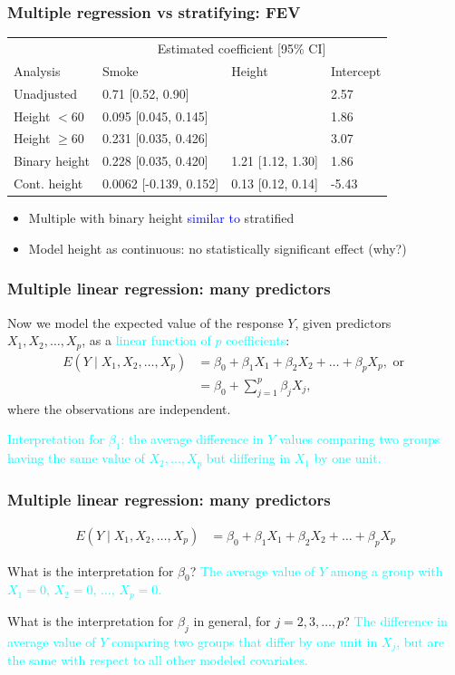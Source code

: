 \documentclass[12pt, 
hyperref={colorlinks=true, linkcolor=blue, urlcolor=cyan}]{beamer}
\begin{document}
\begin{frame}
\frametitle{Multiple regression vs stratifying: FEV}
\vspace{-1cm}\hspace*{-0.75cm}\begin{tabular}{llll}
& \multicolumn{3}{c}{Estimated coefficient [95\% CI]} \\
Analysis & Smoke & Height & Intercept \\
\hline
Unadjusted  & 0.71 [0.52, 0.90] & & 2.57\\
Height $< 60$ & 0.095 [0.045, 0.145]& & 1.86\\
Height $\geq 60$ & 0.231 [0.035, 0.426]& & 3.07 \\
Binary height & 0.228 [0.035, 0.420] & 1.21 [1.12, 1.30] & 1.86\\
Cont. height & 0.0062 [-0.139, 0.152]& 0.13 [0.12, 0.14] & -5.43
\end{tabular}

\begin{itemize}
\item Multiple with binary height \textcolor{blue}{similar to} stratified
\item Model height as continuous: no statistically significant effect (why?)
\end{itemize} 
\end{frame}

\begin{frame}
\frametitle{Multiple linear regression: many predictors}
Now we model the expected value of the response $Y$, given predictors $X_1, X_2, \dots, X_p$, as a \textcolor{cyan}{linear function of $p$ coefficients}:
\begin{align*}
E(Y \mid X_1, X_2, \dots, X_p) &= \beta_0 + \beta_1 X_1 + \beta_2 X_2 + \dots + \beta_p X_p, \text{ or } \\
&= \beta_0 + \sum_{j=1}^p \beta_j X_j,
\end{align*} 
where the observations are independent.

\textcolor{cyan}{Interpretation for $\beta_1$: the average difference in $Y$ values comparing two groups having the same value of $X_2, \dots, X_p$ but differing in $X_1$ by one unit.}

\end{frame}

\begin{frame}
\frametitle{Multiple linear regression: many predictors}
\begin{align*}
E(Y \mid X_1, X_2, \dots, X_p) &= \beta_0 + \beta_1 X_1 + \beta_2 X_2 + \dots + \beta_p X_p
\end{align*}

What is the interpretation for $\beta_0$? \pause \textcolor{cyan}{The average value of $Y$ among a group with $X_1 = 0$, $X_2 = 0$, $\dots$, $X_p = 0$.} \pause

What is the interpretation for $\beta_j$ in general, for $j = 2, 3, \dots, p$? \pause \textcolor{cyan}{The difference in average value of $Y$ comparing two groups that differ by one unit in $X_j$, but are the same with respect to all other modeled covariates.}

\end{frame}
\end{document}
